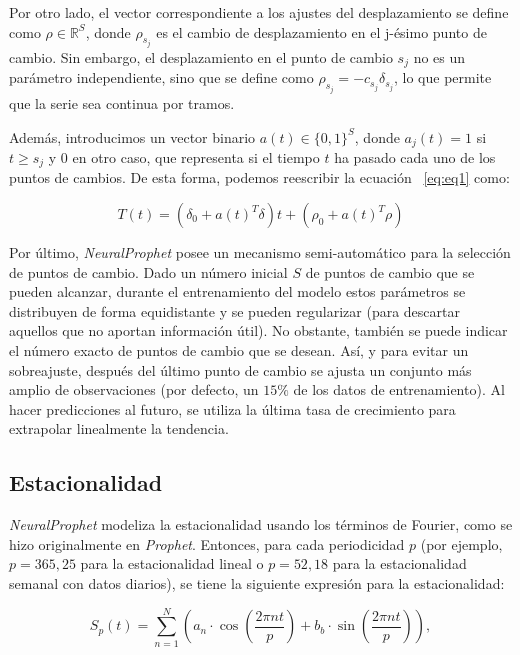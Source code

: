 \documentclass[12pt,twoside]{article}
\begin{document}
Por otro lado, el vector correspondiente a los ajustes del desplazamiento se define como $\rho \in \mathbb{R}^S$, donde $\rho_{s_j}$ es el cambio de desplazamiento en el j-ésimo punto de cambio. Sin embargo, el desplazamiento en el punto de cambio $s_j$ no es un parámetro independiente, sino que se define como $\rho_{s_j} = -c_{s_j} \delta_{s_j}$, lo que permite que la serie sea continua por tramos.

Además, introducimos un vector binario $a(t) \in \{0,1\}^S$, donde $a_j(t) = 1$ si $t\geq s_j$ y $0$ en otro caso, que representa si el tiempo $t$ ha pasado cada uno de los puntos de cambios. De esta forma, podemos reescribir la ecuación ~\ref{eq:eq1} como:

\begin{equation}
T(t) = (\delta_0 + a(t)^T \delta)t + (\rho_0 + a(t)^T\rho)
\end{equation}

Por último, \textit{NeuralProphet} posee un mecanismo semi-automático para la selección de puntos de cambio. Dado un número inicial $S$ de puntos de cambio que se pueden alcanzar, durante el entrenamiento del modelo  estos parámetros se distribuyen de forma equidistante y se pueden regularizar (para descartar aquellos que no aportan información útil). No obstante, también se puede indicar el número exacto de puntos de cambio que se desean. Así, y para evitar un sobreajuste, después del último punto de cambio se ajusta un conjunto más amplio de observaciones (por defecto, un $15\%$ de los datos de entrenamiento). Al hacer predicciones al futuro, se utiliza la última tasa de crecimiento para extrapolar linealmente la tendencia.


\subsection{Estacionalidad}\label{sec:23}

\textit{NeuralProphet} modeliza la estacionalidad usando los términos de Fourier, como se hizo originalmente en \textit{Prophet}. Entonces, para cada periodicidad $p$ (por ejemplo, $p=365,25$ para la estacionalidad lineal o $p=52,18$ para la estacionalidad semanal con datos diarios), se tiene la siguiente expresión para la estacionalidad:

\begin{equation}
S_p(t) = \sum_{n=1}^{N} \left( a_n \cdot \cos\left( \frac{2\pi n t}{p} \right) + b_b \cdot \sin\left( \frac{2\pi n t}{p} \right) \right),
\end{equation}
\end{document}
